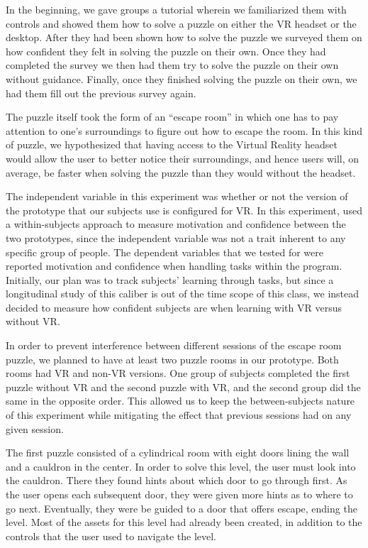 \documentclass[manuscript,screen,review]{acmart}
\begin{document}
In the beginning, we gave groups a tutorial wherein we familiarized them with controls and showed them how to solve a puzzle on either the VR headset or the desktop. After they had been shown how to solve the puzzle we surveyed them on how confident they felt in solving the puzzle on their own. Once they had completed the survey we then had them try to solve the puzzle on their own without guidance. Finally, once they finished solving the puzzle on their own, we had them fill out the previous survey again.

The puzzle itself took the form of an “escape room” in which one has to pay attention to one’s surroundings to figure out how to escape the room. In this kind of puzzle, we hypothesized that having access to the Virtual Reality headset would allow the user to better notice their surroundings, and hence users will, on average, be faster when solving the puzzle than they would without the headset.

The independent variable in this experiment was whether or not the version of the prototype that our subjects use is configured for VR. In this experiment, used a within-subjects approach to measure motivation and confidence between the two prototypes, since the independent variable was not a trait inherent to any specific group of people. The dependent variables that we tested for were reported motivation and confidence when handling tasks within the program. Initially, our plan was to track subjects’ learning through tasks, but since a longitudinal study of this caliber is out of the time scope of this class, we instead decided to measure how confident subjects are when learning with VR versus without VR.

In order to prevent interference between different sessions of the escape room puzzle, we planned to have at least two puzzle rooms in our prototype. Both rooms had VR and non-VR versions. One group of subjects completed the first puzzle without VR and the second puzzle with VR, and the second group did the same in the opposite order. This allowed us to keep the between-subjects nature of this experiment while mitigating the effect that previous sessions had on any given session.

The first puzzle consisted of a cylindrical room with eight doors lining the wall and a cauldron in the center. In order to solve this level, the user must look into the cauldron. There they found hints about which door to go through first. As the user opens each subsequent door, they were given more hints as to where to go next. Eventually, they were be guided to a door that offers escape, ending the level. Most of the assets for this level had already been created, in addition to the controls that the user used to navigate the level.
\clearpage
\end{document}
